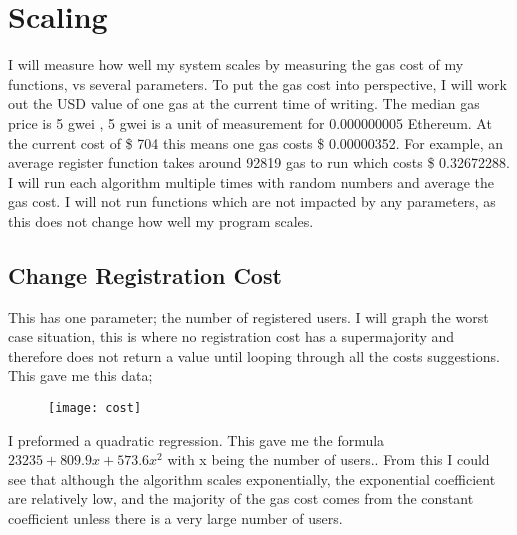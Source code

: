\section{Scaling}
I will measure how well my system scales by measuring the gas cost of my functions, vs several parameters. To put the gas cost into perspective, I will work out the USD value of one gas at the current time of writing. The median gas price is 5 gwei \citep{ethgas:2018:pdflatex}, 5 gwei is a unit of measurement for 0.000000005 Ethereum. At the current cost of \$ 704 this means one gas costs  \$ 0.00000352. For example, an average register function takes around 92819 gas to run which costs \$ 0.32672288. \\
I will run each algorithm multiple times with random numbers and average the gas cost. I will not run functions which are not impacted by any parameters, as this does not change how well my program scales. 
\subsection{Change Registration Cost}
This has one parameter; the number of registered users. I will graph the worst case situation, this is where no registration cost has a supermajority and therefore does not return a value until looping through all the costs suggestions. This gave me this data; \\
\begin{figure}[H]
\texttt{[image: cost]}
\end{figure}
I preformed a quadratic regression. This gave me the formula $23235 + 809.9x + 573.6x^2$  with x being the number of users.. From this I could see that although the algorithm scales exponentially, the exponential coefficient are relatively low, and the majority of the gas cost comes from the constant coefficient unless there is a very large number of users. 
